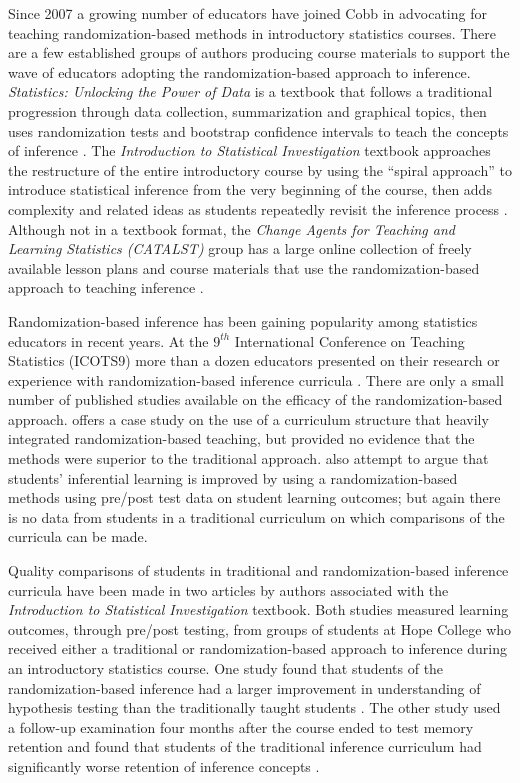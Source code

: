 Since 2007 a growing number of educators have joined Cobb in advocating for teaching randomization-based methods in introductory statistics courses. There are a few established groups of authors producing course materials to support the wave of educators adopting the randomization-based approach to inference. \textit{Statistics: Unlocking the Power of Data} is a textbook that follows a traditional progression through data collection, summarization and graphical topics, then uses randomization tests and bootstrap confidence intervals to teach the concepts of inference \citep{Lock5}. The \textit{Introduction to Statistical Investigation} textbook approaches the restructure of the entire introductory course by using the ``spiral approach'' to introduce statistical inference from the very beginning of the course, then adds complexity and related ideas as students repeatedly revisit the inference process \citep{ISI}. Although not in a textbook format, the \textit{Change Agents for Teaching and Learning Statistics (CATALST)} group has a large online collection of freely available lesson plans and course materials that use the randomization-based approach to teaching inference \citep{CATALST}. 

Randomization-based inference has been gaining popularity among statistics educators in recent years.  At the $9^{th}$ International Conference on Teaching Statistics (ICOTS9) more than a dozen educators presented on their research or experience with randomization-based inference curricula \citep{ICOTS9}. There are only a small number of published studies available on the efficacy of the randomization-based approach. \citet{Carver2011} offers a case study on the use of a curriculum structure that heavily integrated randomization-based teaching, but provided no evidence that the methods were superior to the traditional approach. \citep{Budgett2013} also attempt to argue that students' inferential learning is improved by using a randomization-based methods using pre/post test data on student learning outcomes; but again there is no data from students in a traditional curriculum on which comparisons of the curricula can be made. 

Quality comparisons of students in traditional and randomization-based inference curricula have been made in two articles by authors associated with the \textit{Introduction to Statistical Investigation} textbook. Both studies measured learning outcomes, through pre/post testing, from groups of students at Hope College who received either a traditional or randomization-based approach to inference during an introductory statistics course. One study found that students of the randomization-based inference had a larger improvement in understanding of hypothesis testing than the traditionally taught students \citep{Tintle2011}. The other study used a follow-up examination four months after the course ended to test memory retention and found that students of the traditional inference curriculum had significantly worse retention of inference concepts \citep{Tintle2012}. 

